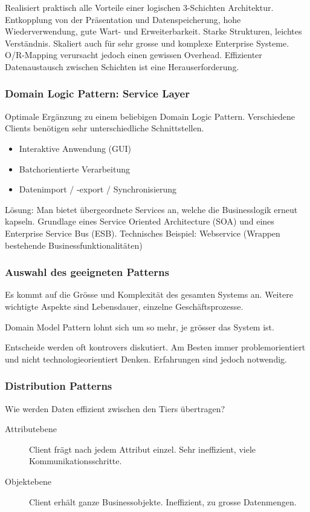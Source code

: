 Realisiert praktisch alle Vorteile einer logischen 3-Schichten Architektur. Entkopplung von der Präsentation und Datenspeicherung, hohe Wiederverwendung, gute Wart- und Erweiterbarkeit. Starke Strukturen, leichtes Verständnis. Skaliert auch für sehr grosse und komplexe Enterprise Systeme.
O/R-Mapping verursacht jedoch einen gewissen Overhead. Effizienter Datenaustausch zwischen Schichten ist eine Herauserforderung.

\subsubsection{Domain Logic Pattern: Service Layer}
Optimale Ergänzung zu einem beliebigen Domain Logic Pattern. Verschiedene Clients benötigen sehr unterschiedliche Schnittstellen.

\begin{itemize}
	\item Interaktive Anwendung (GUI)
	\item Batchorientierte Verarbeitung
	\item Datenimport / -export / Synchronisierung
\end{itemize}

Lösung: Man bietet übergeordnete Services an, welche die Businesslogik erneut kapseln. Grundlage eines Service Oriented Architecture (SOA) und eines Enterprise Service Bus (ESB). Technisches Beispiel: Webservice (Wrappen bestehende Businessfunktionalitäten)

\subsubsection{Auswahl des geeigneten Patterns}
Es kommt auf die Grösse und Komplexität des gesamten Systems an. Weitere wichtigte Aspekte sind Lebensdauer, einzelne Geschäftsprozesse.

Domain Model Pattern lohnt sich um so mehr, je grösser das System ist.

Entscheide werden oft kontrovers diskutiert. Am Besten immer problemorientiert und nicht technologieorientiert Denken. Erfahrungen sind jedoch notwendig.

\subsubsection{Distribution Patterns}
Wie werden Daten effizient zwischen den Tiers übertragen?

\begin{description}
	\item[Attributebene] Client frägt nach jedem Attribut einzel. Sehr ineffizient, viele Kommunikationsschritte.
	\item[Objektebene] Client erhält ganze Businessobjekte. Ineffizient, zu grosse Datenmengen.
\end{description}

